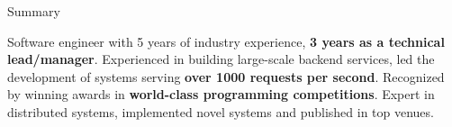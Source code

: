 \documentclass[
	10pt, %
]{resume} %
\begin{document}

\begin{rSection}{Summary}

  Software engineer with 5 years of industry experience, \textbf{3 years as a technical
  lead/manager}. Experienced in building large-scale backend services,
  led the development of systems serving \textbf{over 1000 requests per second}. Recognized by winning
  awards in \textbf{world-class programming competitions}. Expert in distributed systems,
  implemented novel systems and published in top venues.

\end{rSection}

\end{document}
